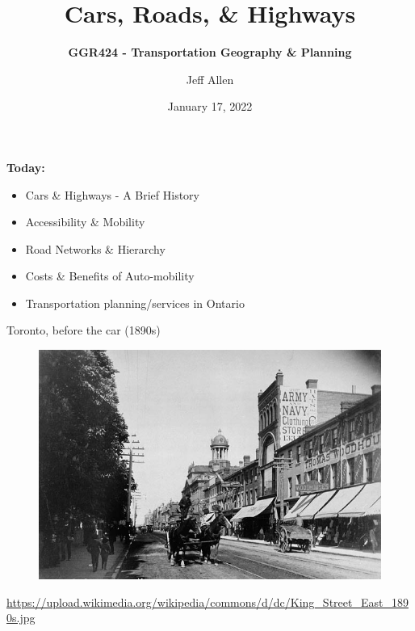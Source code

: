 \documentclass[aspectratio=169]{beamer}
\title{\textbf{Cars, Roads, \& Highways}}
\subtitle{\textbf{GGR424 - Transportation Geography \& Planning}}
\author{Jeff Allen}
\institute{University of Toronto}
\date{January 17, 2022}
\begin{document}
	
\begin{frame}
	\titlepage	
\end{frame}



\begin{frame}
\textbf{Today:}
\begin{itemize}
	\item Cars \& Highways - A Brief History
	\item Accessibility \& Mobility
	\item Road Networks \& Hierarchy
	\item Costs \& Benefits of Auto-mobility
	\item Transportation planning/services in Ontario
\end{itemize}
\end{frame}






\begin{frame}
	
	Toronto, before the car (1890s)
	
	\begin{figure}
		\centering
		\includegraphics[width=0.8\linewidth]{images/king_east_1890s.jpg}
		
	\end{figure}
	
	\tiny{\url{https://upload.wikimedia.org/wikipedia/commons/d/dc/King_Street_East_1890s.jpg}}
\end{frame}
\end{document}
